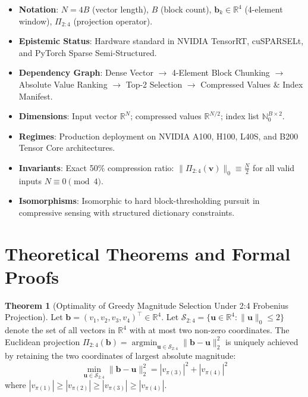 \documentclass[11pt,a4paper]{article}
\theoremstyle{definition}
\newtheorem{theorem}{\textbf{Theorem}}[section]
\begin{document}
\begin{itemize}
    \item \textbf{Notation}: $N = 4B$ (vector length), $B$ (block count), $\mathbf{b}_k \in \mathbb{R}^4$ (4-element window), $\Pi_{2:4}$ (projection operator).
    \item \textbf{Epistemic Status}: Hardware standard in NVIDIA TensorRT, cuSPARSELt, and PyTorch Sparse Semi-Structured.
    \item \textbf{Dependency Graph}: Dense Vector $\to$ 4-Element Block Chunking $\to$ Absolute Value Ranking $\to$ Top-2 Selection $\to$ Compressed Values \& Index Manifest.
    \item \textbf{Dimensions}: Input vector $\mathbb{R}^N$; compressed values $\mathbb{R}^{N/2}$; index list $\mathbb{N}_0^{B \times 2}$.
    \item \textbf{Regimes}: Production deployment on NVIDIA A100, H100, L40S, and B200 Tensor Core architectures.
    \item \textbf{Invariants}: Exact 50\% compression ratio: $\|\Pi_{2:4}(\mathbf{v})\|_0 \equiv \frac{N}{2}$ for all valid inputs $N \equiv 0 \pmod 4$.
    \item \textbf{Isomorphisms}: Isomorphic to hard block-thresholding pursuit in compressive sensing with structured dictionary constraints.
\end{itemize}

\section{Theoretical Theorems and Formal Proofs}

\begin{theorem}[Optimality of Greedy Magnitude Selection Under 2:4 Frobenius Projection]
Let $\mathbf{b} = (v_1, v_2, v_3, v_4)^\top \in \mathbb{R}^4$. Let $\mathcal{S}_{2:4} = \{ \mathbf{u} \in \mathbb{R}^4 : \|\mathbf{u}\|_0 \le 2 \}$ denote the set of all vectors in $\mathbb{R}^4$ with at most two non-zero coordinates. The Euclidean projection $\Pi_{2:4}(\mathbf{b}) = \operatorname{argmin}_{\mathbf{u} \in \mathcal{S}_{2:4}} \|\mathbf{b} - \mathbf{u}\|_2^2$ is uniquely achieved by retaining the two coordinates of largest absolute magnitude:
{\boldmath
\begin{equation}
\min_{\mathbf{u} \in \mathcal{S}_{2:4}} \|\mathbf{b} - \mathbf{u}\|_2^2 = |v_{\pi(3)}|^2 + |v_{\pi(4)}|^2
\end{equation}
}
where $|v_{\pi(1)}| \ge |v_{\pi(2)}| \ge |v_{\pi(3)}| \ge |v_{\pi(4)}|$.
\end{theorem}
\end{document}
